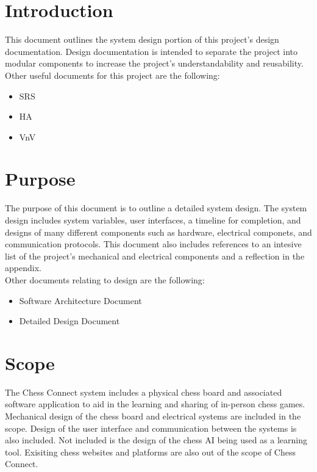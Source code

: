 \documentclass[12pt, titlepage]{article}
\begin{document}

\section{Introduction}
This document outlines the system design portion of this project's design documentation. Design documentation 
is intended to separate the project into modular components to increase the project's understandability and reusability. \\
Other useful documents for this project are the following:
\begin{itemize}
  \item SRS
  \item HA
  \item VnV
\end{itemize}

\section{Purpose}
The purpose of this document is to outline a detailed system design. The system design includes system variables, user interfaces, a timeline for completion, and designs of many 
different components such as hardware, electrical componets, and communication protocols. This document also includes references to an intesive list of the project's
mechanical and electrical components and a reflection in the appendix. \\
Other documents relating to design are the following:
\begin{itemize}
  \item Software Architecture Document
  \item Detailed Design Document
\end{itemize}
\section{Scope}
The Chess Connect system includes a physical chess board and associated software 
application to aid in the learning and sharing of in-person chess games. 
Mechanical design of the chess board and electrical systems are included in the 
scope. Design of the user interface and communication between the systems is also
included. 
Not included is the design of the chess AI being used as a learning tool. Exisiting
chess websites and platforms are also out of the scope of Chess Connect.
\end{document}
